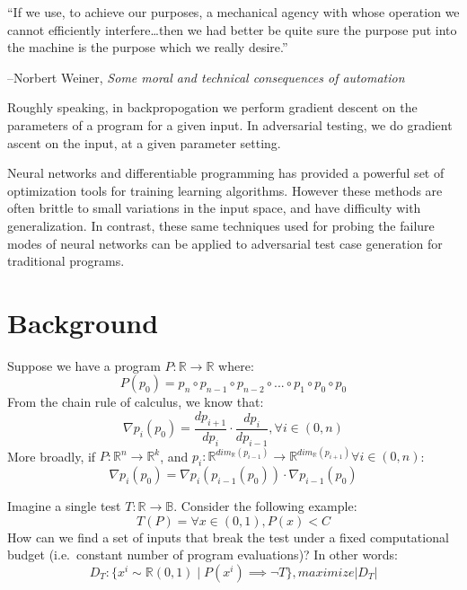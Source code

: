 \documentclass[12pt,initial,twoside,maitrise]{dms}
\numberwithin{equation}{section}
\numberwithin{table}{chapter}
\numberwithin{figure}{chapter}
\begin{document}
\setlength{\epigraphwidth}{0.78\textwidth}
\epigraph{``If we use, to achieve our purposes, a mechanical agency with whose operation we cannot efficiently interfere\ldots then we had better be quite sure the purpose put into the machine is the purpose which we really desire.''}{\begin{flushright}--Norbert Weiner, \textit{Some moral and technical consequences of automation}~\cite{wiener1960some}\end{flushright}}

Roughly speaking, in backpropogation we perform gradient descent on the parameters of a program for a given input. In adversarial testing, we do gradient ascent on the input, at a given parameter setting.

Neural networks and differentiable programming has provided a powerful set of optimization tools for training learning algorithms. However these methods are often brittle to small variations in the input space, and have difficulty with generalization. In contrast, these same techniques used for probing the failure modes of neural networks can be applied to adversarial test case generation for traditional programs.

\section{Background}

%
Suppose we have a program $P: \mathbb{R}\rightarrow\mathbb{R}$ where:
%
\begin{equation}
    P(p_0)=p_n \circ p_{n-1} \circ p_{n-2} \circ ... \circ p_1 \circ p_0 \circ p_0
\end{equation}
%
From the chain rule of calculus, we know that:
%
\begin{equation}
    \nabla p_i(p_0) = \frac{dp_{i+1}}{dp_{i}} \cdot \frac{dp_{i}}{dp_{i-1}}, \forall i \in (0, n)
\end{equation}
%
More broadly, if $P: \mathbb{R}^n\rightarrow\mathbb{R}^k$, and $p_{i}: \mathbb{R}^{dim_{\mathbb{R}}(p_{i-1})}\rightarrow \mathbb{R}^{dim_{\mathbb{R}}(p_{i+1})} \forall i \in (0, n)$:
%
\begin{equation}
    \nabla p_i(p_0) = \nabla p_i(p_{i-1}(p_0)) \cdot \nabla p_{i-1}(p_0)
\end{equation}

%
%
Imagine a single test $T: \mathbb{R} \rightarrow \mathbb{B}$. Consider the following example:
%
\begin{equation}
    T(P) = \forall x \in (0, 1), P(x) < C
\end{equation}
%
How can we find a set of inputs that break the test under a fixed computational budget (i.e.\ constant number of program evaluations)? In other words:
%
\begin{equation}
    D_T: \{ x^i \sim \mathbb{R}(0, 1) \mid P(x^i) \implies \neg T \}, maximize |D_T|
\end{equation}
%
\end{document}
